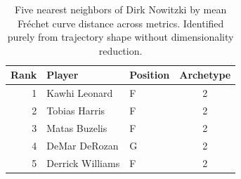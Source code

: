 \begin{table}[htbp]
  \centering\small
  \begin{tabular}{rllc}
    \toprule
    Rank & Player & Position & Archetype \\
    \midrule
    1 & Kawhi Leonard & F & 2 \\
    2 & Tobias Harris & F & 2 \\
    3 & Matas Buzelis & F & 2 \\
    4 & DeMar DeRozan & G & 2 \\
    5 & Derrick Williams & F & 2 \\
    \bottomrule
  \end{tabular}
  \caption{Five nearest neighbors of Dirk Nowitzki by mean Fr\'{e}chet curve distance across metrics. Identified purely from trajectory shape without dimensionality reduction.}
  \label{tab:Dirk_Nowitzki_frechet_curve_neighbors}
\end{table}

